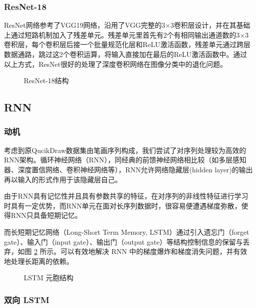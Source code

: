 \subsubsection{ResNet-18}
ResNet\cite{resnet}网络参考了VGG19网络，沿用了VGG完整的3×3卷积层设计，并在其基础上通过短路机制加入了残差单元。残差单元里首先有2个有相同输出通道数的3×3卷积层，每个卷积层后接一个批量规范化层和ReLU激活函数，残差单元通过跨层数据通路，跳过这2个卷积运算，将输入直接加在最后的ReLU激活函数中。通过以上方式，ResNet很好的处理了深度卷积网络在图像分类中的退化问题。

\begin{figure}[ht]
    \centering
    
    \caption{ResNet-18结构}
    \label{fig:ResNet-18}
\end{figure}

\subsection{RNN}

\subsubsection{动机}
考虑到原QucikDraw数据集由笔画序列构成，我们尝试了对序列处理较为高效的RNN架构。循环神经网络（RNN），同经典的前馈神经网络相比较（如多层感知器、深度置信网络、卷积神经网络等），RNN允许网络隐藏层(hidden layer)的输出再以输入的形式作用于该隐藏层自己。

由于RNN具有记忆性并且具有参数共享的特征，在对序列的非线性特征进行学习时具有一定优势，而RNN单元在面对长序列数据时，很容易便遭遇梯度弥散，使得RNN只具备短期记忆。

而长短期记忆网络（Long-Short Term Memory, LSTM）通过引入遗忘门（forget gate）、输入门（input gate）、输出门（output gate）等结构控制信息的保留与丢弃，如图 \ref{fig:lstm} 所示。可以有效地解决 RNN 中的梯度爆炸和梯度消失问题，并有效地处理长距离的依赖。


\begin{figure}[ht]
    \centering
    
    \caption{LSTM 元胞结构}
    \label{fig:lstm}
\end{figure}

\subsubsection{双向 LSTM}

